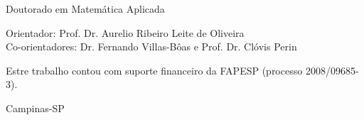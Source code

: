 \begin{titlepage}
\begin{center}
{\sffamily \normalsize{Doutorado em Matem\'atica Aplicada}}
\end{center}
\vspace{1cm}
\begin{center}
 
{ \sffamily Orientador: {\large Prof. Dr.  Aurelio Ribeiro Leite de Oliveira}}\\[2mm] 
{ \sffamily Co-orientadores: {\large Dr. Fernando Villas-Bôas e Prof. Dr. Clóvis
Perin}}
\end{center}  
\vspace{1.5cm}

\begin{center}
{\sffamily Estre trabalho contou com suporte financeiro da FAPESP (processo
2008/09685-3).
 \vspace{1cm}

Campinas-SP

}
\end{center}

\end{titlepage}
\cleardoublepage

